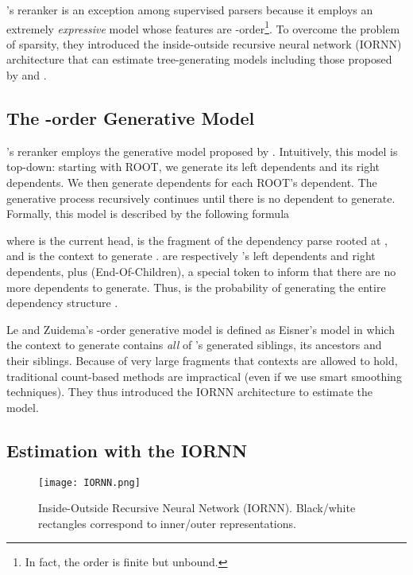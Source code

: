 \documentclass[11pt,letterpaper]{article}
\begin{document}
's reranker is an exception among supervised 
parsers because it employs an extremely \textit{expressive} model
whose features are -order\footnote{In fact, the order is finite but unbound.}. 
To overcome the problem of 
sparsity, they introduced the inside-outside recursive
neural network (IORNN) architecture that can estimate 
tree-generating models including those proposed by 
 and . 

\subsection{The -order Generative Model}

's reranker employs the generative model proposed by 
. Intuitively, this model is top-down: starting 
with ROOT, we generate its left dependents and its right dependents. 
We then generate dependents for each ROOT's dependent. The generative 
process recursively continues until there is no dependent to generate. 
Formally, this model is described by the following formula
{\small

}
where  is the current head,  is the fragment of the dependency 
parse rooted at , and  is the context to generate .  
 are respectively 's left dependents and right dependents, 
plus  (End-Of-Children), a special token to inform that there are 
no more dependents to generate. Thus,  is the probability 
of generating the entire dependency structure .

Le and Zuidema's -order generative model is defined as 
Eisner's model in which the context  
to generate  contains \textit{all} of 's generated siblings, 
its ancestors and their siblings.
Because of very large fragments that contexts are allowed to hold, 
traditional count-based methods are impractical (even if we use smart 
smoothing techniques). They thus introduced the
IORNN architecture to estimate the model.


\subsection{Estimation with the IORNN}

\begin{figure}
    \centering
    \texttt{[image: IORNN.png]}
    \caption{Inside-Outside Recursive Neural Network (IORNN).
            Black/white rectangles correspond to inner/outer representations.}
    \label{figure iornn}
\end{figure}
\end{document}
